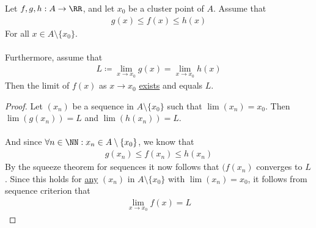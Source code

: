 \documentclass[class=scrartcl, crop=false]{standalone}
\begin{document}
\begin{theorem}
  Let $f, g, h: A \to \RR$, and let $x_0$ be a cluster point of $A$. Assume that 
  \begin{gather*}
    g(x) \leq f(x) \leq h(x)
  \end{gather*} 
  For all $x \in A \setminus \{x_0\}$.
  \\\\
  Furthermore, assume that
  \begin{gather*}
    L \coloneqq \lim_{x \to x_0} g(x) = \lim_{x \to x_0} h(x)
  \end{gather*} 
  Then the limit of $f(x)$ as $x \to x_0$ \ul{exists} and equals $L$.
  \begin{proof}
    Let $(x_n)$ be a sequence in $A \setminus \{x_0\}$ such that $\lim(x_n) = x_0$. Then $\lim(g(x_n)) = L$ and $\lim(h(x_n)) = L$.
    \\\\
    And since $\forall n \in \NN : x_n \in A \setminus \{x_0\}$, we know that
    \begin{gather*}
      g(x_n) \leq f(x_n) \leq h(x_n)
    \end{gather*} 
    By the squeeze theorem for sequences it now follows that $(f(x_n)$ converges to $L$. Since this holds for \ul{any} $(x_n)$ in $A \setminus \{x_0\}$ with $\lim(x_n) = x_0$, it follows from sequence criterion that
    \begin{gather*}
      \lim_{x \to x_0} f(x) = L
    \end{gather*} 
  \end{proof} 
\end{theorem} 
\end{document}
